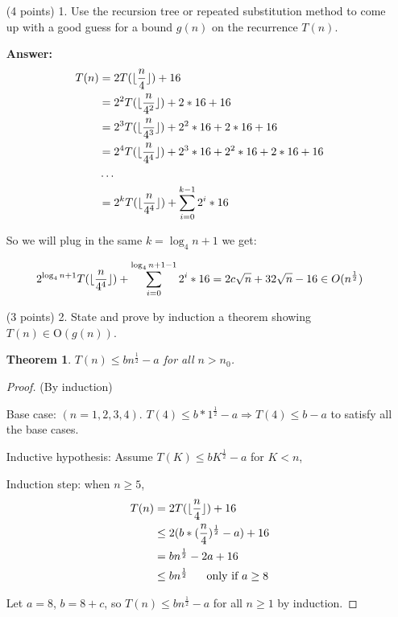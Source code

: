 \documentclass[paper=a4, fontsize=11pt]{scrartcl}
\DeclarePairedDelimiter\floor{\lfloor}{\rfloor}
\newtheorem{theorem}{Theorem}
\numberwithin{equation}{section}		%
\numberwithin{figure}{section}			%
\numberwithin{table}{section}				%
\begin{document}
\begin{enumerate}
\item [(4 points) 1.] Use the recursion tree or repeated substitution method to come up with a good guess for a bound $g(n)$ on the recurrence $T(n)$.
  
\textbf{Answer:}
\begin{align*}
	T(n) &= 2T(\floor{\frac{n}{4}}) + 16 \\
		&= 2^2T(\floor{\frac{n}{4^2}}) + 2*16 + 16 \\
		&= 2^3T(\floor{\frac{n}{4^3}}) + 2^2*16 + 2*16 + 16 \\
		&= 2^4T(\floor{\frac{n}{4^4}}) + 2^3*16 + 2^2*16 + 2*16 + 16 \\
		&\dots \\
		&= 2^kT(\floor{\frac{n}{4^4}}) + \sum_{i=0}^{k-1} 2^i*16
\end{align*}

So we will plug in the same $k=\log_4 n + 1$ we get:

$$2^{\log_4 n + 1}T(\floor{\frac{n}{4^4}}) + \sum_{i=0}^{\log_4 n + 1-1} 2^i*16 = 2c\sqrt{n} + 32\sqrt{n} - 16\in O(n^{\frac{1}{2}})$$


\item [(3 points) 2.] State and prove by induction a theorem showing $T(n)\in\text{O}(g(n))$.
\begin{theorem}
	$T(n) \leq bn^{\frac{1}{2}} - a$ for all $n>n_0$.
\end{theorem}
\begin{proof}(By induction)
	
	Base case: $(n = 1,2,3,4)$.
	$T(4) \leq b*1^{\frac{1}{2}} - a \Rightarrow T(4) \leq b-a$ to satisfy all the base cases.  
	
	Inductive hypothesis: Assume $T(K) \leq bK^{\frac{1}{2}} - a$ for $K<n$,
	
	Induction step: when $n\geq 5$,
	\begin{align*}
	T(n) &= 2T(\floor{\frac{n}{4}}) + 16 \\
	&\leq 2(b*(\frac{n}{4})^{\frac{1}{2}}-a) + 16 \\
	&= bn^{\frac{1}{2}} - 2a + 16 \\
	&\leq bn^{\frac{1}{2}} \ \ \ \ \text{ only if } a \geq 8
	\end{align*}
	
	Let $a=8$, $b=8+c$, so $T(n) \leq bn^{\frac{1}{2}} - a$ for all $n\geq1$ by induction.
\end{proof}




\end{enumerate}
\end{document}
